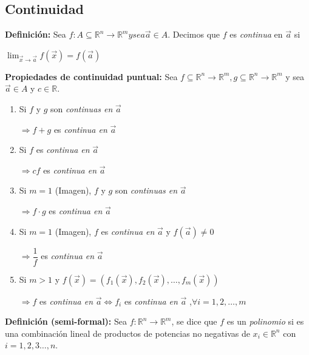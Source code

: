 \documentclass[12pt]{article}
\begin{document}
\subsection*{Continuidad}
\textbf{Definición:} Sea $f:A\subseteq\mathbb{R}^n\rightarrow\mathbb{R}^m y sea \vec{a}\in A.$ Decimos que $f$ es \emph{continua} en
$\vec{a}$ si
\begin{center}
    $\lim_{\vec{x}\rightarrow\vec{a}}{f(\vec{x})}=f(\vec{a})$
\end{center}
\textbf{Propiedades de continuidad puntual: }\newline
\noindent Sea $f\subseteq\mathbb{R}^n\rightarrow\mathbb{R}^m, g\subseteq\mathbb{R}^n\rightarrow\mathbb{R}^m$ y sea $\vec{a}\in A$ y $c\in\mathbb{R}$.
\begin{enumerate}
    \item Si $f$ y $g$ son \emph{continuas en } $\vec{a}$
            \begin{center}
                $\Rightarrow f+g$ es \emph{continua en} $\vec{a}$
            \end{center}
    \item Si $f$ es \emph{continua en } $\vec{a}$
            \begin{center}
                $\Rightarrow cf$ es \emph{continua en} $\vec{a}$ 
            \end{center}
    \item Si $m=1$ (Imagen), $f$ y $g$ son \emph{continuas en } $\vec{a}$
            \begin{center}
                $\Rightarrow f\cdot{}g$ es \emph{continua en } $\vec{a}$
            \end{center}
    \item Si $m=1$ (Imagen), $f$ es \emph{continua en } $\vec{a}$ y $f(\vec{a})\not = 0$
            \begin{center}
                $\Rightarrow \dfrac{1}{f}$ es \emph{continua en } $\vec{a}$
            \end{center}
    \item Si $m>1$ y $f(\vec{x})=\left(f_1(\vec{x}),f_2(\vec{x}),\dots,f_m(\vec{x})\right)$
            \begin{center}
                $\Rightarrow f$ es \emph{continua en} $\vec{a} \Leftrightarrow f_i$ es \emph{continua en} $\vec{a}$ ,$\forall i=1,2,\dots,m$
            \end{center}
\end{enumerate}

\noindent\textbf{Definición (semi-formal):} Sea $f:\mathbb{R}^n\rightarrow\mathbb{R}^m$, se dice que $f$ es un \emph{polinomio} si es una
combinación lineal de productos de potencias no negativas de $x_i\in\mathbb{R}^n$ con $i=1,2,3\dots,n$.\newline
\end{document}
